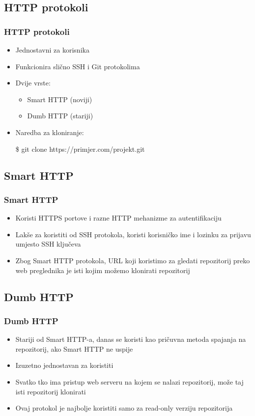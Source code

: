 \subsection{HTTP protokoli}

\begin{frame}
\frametitle{HTTP protokoli}
\begin{itemize}
	\item Jednostavni za korisnika
	\item Funkcionira slično SSH i Git protokolima
	\item Dvije vrste:
	\begin{itemize}
		\item Smart HTTP (noviji)
		\item Dumb HTTP (stariji)
	\end{itemize}
	\item Naredba za kloniranje:

	\$ git clone https://primjer.com/projekt.git
\end{itemize}
\end{frame}


\subsection{Smart HTTP}
\begin{frame}
\frametitle{Smart HTTP}
\begin{itemize}
	\item Koristi HTTPS portove i razne HTTP mehanizme za autentifikaciju
	\item Lakše za koristiti od SSH protokola, koristi korisničko ime i lozinku za prijavu umjesto SSH ključeva
	\item Zbog Smart HTTP protokola, URL koji koristimo za gledati repozitorij preko web preglednika je isti kojim možemo klonirati repozitorij
\end{itemize}
\end{frame}


\subsection{Dumb HTTP}
\begin{frame}
\frametitle{Dumb HTTP}
\begin{itemize}
	\item Stariji od Smart HTTP-a, danas se koristi kao pričuvna metoda spajanja na repozitorij, ako Smart HTTP ne uspije
	\item Izuzetno jednostavan za koristiti
	\item Svatko tko ima pristup web serveru na kojem se nalazi repozitorij, može taj isti repozitorij klonirati
	\item Ovaj protokol je najbolje koristiti samo za read-only verziju repozitorija
\end{itemize}
\end{frame}